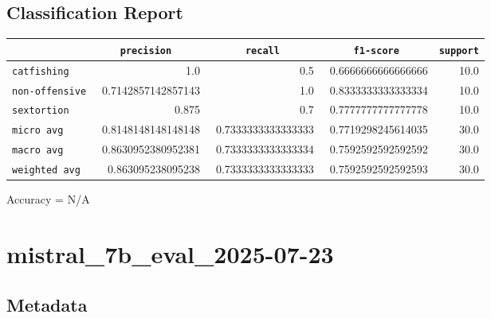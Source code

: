 \documentclass{article}
\begin{document}
\subsection{Classification Report}

\begin{center}
\begin{tabular}{l | r | r | r | r} \hline
    \verb|            | & \verb|    precision     | & \verb|      recall      | & \verb|     f1-score     | & \verb|support| \\ \hline
    \hline
    \verb|catfishing | & 1.0 & 0.5 & 0.6666666666666666 &    10.0 \\ \hline
    \verb|non-offensive| & 0.7142857142857143 & 1.0 & 0.8333333333333334 &    10.0 \\ \hline
    \verb|sextortion | & 0.875 & 0.7 & 0.7777777777777778 &    10.0 \\ \hline
    \verb|micro avg  | & 0.8148148148148148 & 0.7333333333333333 & 0.7719298245614035 &    30.0 \\ \hline
    \verb|macro avg  | & 0.8630952380952381 & 0.7333333333333334 & 0.7592592592592592 &    30.0 \\ \hline
    \verb|weighted avg| & 0.863095238095238 & 0.7333333333333333 & 0.7592592592592593 &    30.0 \\ \hline
\end{tabular}
\end{center}

\begin{center}
Accuracy = N/A
\end{center}

\section{mistral\_7b\_eval\_2025-07-23}
\subsection{Metadata}
\end{document}
